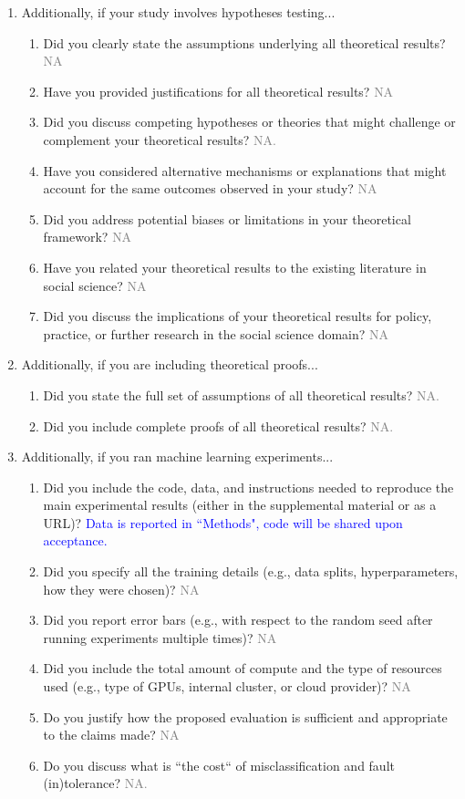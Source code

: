 \documentclass[letterpaper]{article} %
\newcommand{\answerYes}[1]{\textcolor{blue}{#1}}
\newcommand{\answerNA}[1]{\textcolor{gray}{#1}}
\begin{document}
\begin{enumerate}
\item Additionally, if your study involves hypotheses testing...
\begin{enumerate}
  \item Did you clearly state the assumptions underlying all theoretical results?
    \answerNA{NA}
  \item Have you provided justifications for all theoretical results?
    \answerNA{NA}
  \item Did you discuss competing hypotheses or theories that might challenge or complement your theoretical results?
    \answerNA{NA.}
  \item Have you considered alternative mechanisms or explanations that might account for the same outcomes observed in your study?
    \answerNA{NA}
  \item Did you address potential biases or limitations in your theoretical framework?
    \answerNA{NA}
  \item Have you related your theoretical results to the existing literature in social science?
    \answerNA{NA}
  \item Did you discuss the implications of your theoretical results for policy, practice, or further research in the social science domain?
    \answerNA{NA}
\end{enumerate}

\item Additionally, if you are including theoretical proofs...
\begin{enumerate}
  \item Did you state the full set of assumptions of all theoretical results?
    \answerNA{NA.}
	\item Did you include complete proofs of all theoretical results?
    \answerNA{NA.}
\end{enumerate}

\item Additionally, if you ran machine learning experiments...
\begin{enumerate}
  \item Did you include the code, data, and instructions needed to reproduce the main experimental results (either in the supplemental material or as a URL)?
    \answerYes{Data is reported in ``Methods", code will be shared upon acceptance.}
  \item Did you specify all the training details (e.g., data splits, hyperparameters, how they were chosen)?
    \answerNA{NA}
     \item Did you report error bars (e.g., with respect to the random seed after running experiments multiple times)?
    \answerNA{NA}
	\item Did you include the total amount of compute and the type of resources used (e.g., type of GPUs, internal cluster, or cloud provider)?
    \answerNA{NA}
     \item Do you justify how the proposed evaluation is sufficient and appropriate to the claims made? 
    \answerNA{NA}
     \item Do you discuss what is ``the cost`` of misclassification and fault (in)tolerance?
    \answerNA{NA.}
  

\end{enumerate}
\end{enumerate}
\end{document}

